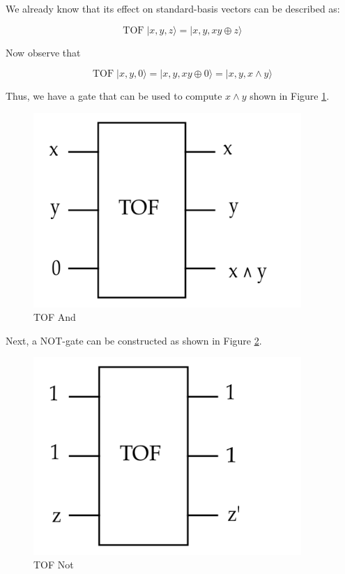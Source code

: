 \documentclass[main.tex]{subfiles}
\begin{document}
    We already know that its effect on standard-basis vectors can be described as:
    
    $$
    \operatorname{TOF}|x, y, z\rangle=|x, y, x y \oplus z\rangle
    $$
    
    Now observe that
    
    $$
    \operatorname{TOF}|x, y, 0\rangle=|x, y, x y \oplus 0\rangle=|x, y, x \wedge y\rangle
    $$
    
    Thus, we have a gate that can be used to compute $x \wedge y$ shown in Figure \ref{fig:16toffoli2}.
    
    \begin{figure}
        \centering
        \includegraphics[width=4in]{notes/figs/n10/16toffoli2.png}
        \caption{TOF And}
        \label{fig:16toffoli2}
    \end{figure}
    
    Next, a NOT-gate can be constructed as shown in Figure \ref{fig:17toffoli3}.
    
    \begin{figure}
        \centering
        \includegraphics[width=4in]{notes/figs/n10/17toffoli3.png}
        \caption{TOF Not}
        \label{fig:17toffoli3}
    \end{figure}
    
\end{document}
